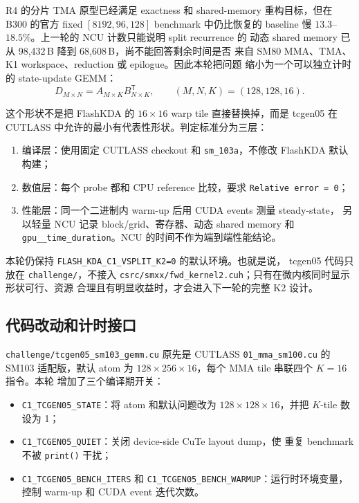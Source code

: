 \documentclass[11pt,a4paper,fontset=none]{ctexart}
\newcommand{\code}[1]{\texttt{#1}}
\begin{document}
R4 的分片 TMA 原型已经满足 exactness 和 shared-memory 重构目标，但在
B300 的官方 fixed \( [8192,96,128] \) benchmark 中仍比恢复的 baseline
慢 \(13.3\)--\(18.5\%\)。上一轮的 NCU 计数只能说明 split recurrence 的
动态 shared memory 已从 98,432\,B 降到 68,608\,B，尚不能回答剩余时间是否
来自 SM80 MMA、TMA、K1 workspace、reduction 或 epilogue。因此本轮把问题
缩小为一个可以独立计时的 state-update GEMM：
\[
  D_{M\times N}=A_{M\times K}B_{N\times K}^{\mathsf T},\qquad
  (M,N,K)=(128,128,16).
\]

这个形状不是把 FlashKDA 的 \(16\times16\) warp tile 直接替换掉，而是
tcgen05 在 CUTLASS 中允许的最小有代表性形状。判定标准分为三层：

\begin{enumerate}
\item 编译层：使用固定 CUTLASS checkout 和 \code{sm\_103a}，不修改
      FlashKDA 默认构建；
\item 数值层：每个 probe 都和 CPU reference 比较，要求
      \code{Relative error = 0}；
\item 性能层：同一个二进制内 warm-up 后用 CUDA events 测量 steady-state，
      另以轻量 NCU 记录 block/grid、寄存器、动态 shared memory 和
      \code{gpu\_\_time\_duration}。NCU 的时间不作为端到端性能结论。
\end{enumerate}

本轮仍保持 \code{FLASH\_KDA\_C1\_VSPLIT\_K2=0} 的默认环境。也就是说，
tcgen05 代码只放在 \code{challenge/}，不接入
\code{csrc/smxx/fwd\_kernel2.cuh}；只有在微内核同时显示形状可行、资源
合理且有明显收益时，才会进入下一轮的完整 K2 设计。

\subsection{代码改动和计时接口}

\code{challenge/tcgen05\_sm103\_gemm.cu} 原先是 CUTLASS
\code{01\_mma\_sm100.cu} 的 SM103 适配版，默认 atom 为
\(128\times256\times16\)，每个 MMA tile 串联四个 \(K=16\) 指令。本轮
增加了三个编译期开关：

\begin{itemize}
\item \code{C1\_TCGEN05\_STATE}：将 atom 和默认问题改为
      \(128\times128\times16\)，并把 \(K\)-tile 数设为 1；
\item \code{C1\_TCGEN05\_QUIET}：关闭 device-side CuTe layout dump，使
      重复 benchmark 不被 \code{print()} 干扰；
\item \code{C1\_TCGEN05\_BENCH\_ITERS} 和
      \code{C1\_TCGEN05\_BENCH\_WARMUP}：运行时环境变量，控制 warm-up
      和 CUDA event 迭代次数。
\end{itemize}
\end{document}

